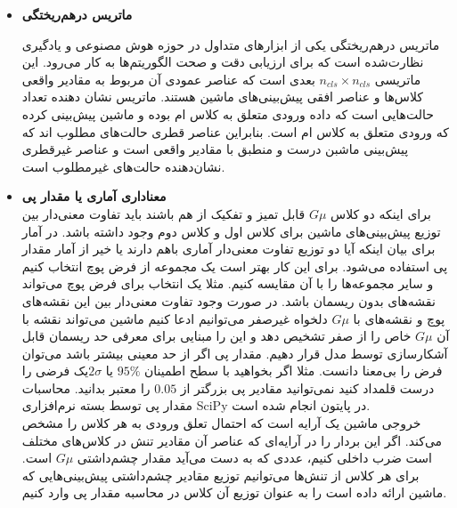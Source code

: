\begin{itemize}
	\item \textbf{ماتریس درهم‌ریختگی}
	
	ماتریس درهم‌ریختگی یکی از ابزارهای متداول در حوزه هوش مصنوعی و یادگیری نظارت‌شده است که برای ارزیابی دقت و صحت الگوریتم‌ها به کار می‌رود. این ماتریسی   
	$n_{cls} \times n_{cls}$
	بعدی است که عناصر عمودی آن مربوط به مقادیر واقعی کلاس‌ها و عناصر افقی پیش‌بینی‌های ماشین هستند. 
	 ماتریس نشان دهنده تعداد حالت‌هایی است که داده ورودی متعلق به کلاس  ام بوده و ماشین پیش‌بینی کرده که ورودی متعلق به کلاس  ام است. بنابراین عناصر قطری حالت‌های مطلوب اند که پیش‌بینی ماشبن درست و منطبق با مقادیر واقعی است و عناصر غیرقطری نشان‌دهنده حالت‌های غیرمطلوب است.
	\item \textbf{معناداری آماری یا مقدار پی} \\
	برای اینکه دو کلاس $G\mu$ قابل تمیز و تفکیک از هم باشند باید تفاوت معنی‌دار بین توزیع پیش‌بینی‌های ماشین برای کلاس اول و کلاس دوم وجود داشته باشد. در آمار برای بیان اینکه آیا دو توزیع تفاوت معنی‌دار آماری باهم دارند یا خیر از آمار مقدار پی	استفاده می‌شود. برای این کار بهتر است یک مجموعه از فرض پوچ 
	انتخاب کنیم و سایر مجموعه‌ها را با آن مقایسه کنیم.
		\cite{bruce2020practical}
		مثلا یک انتخاب برای فرض پوچ می‌تواند نقشه‌های بدون ریسمان باشد. در صورت وجود تفاوت معنی‌دار بین این نقشه‌های پوچ و نقشه‌های با $G\mu$ دلخواه غیرصفر می‌توانیم ادعا کنیم ماشین می‌تواند نقشه با آن $G\mu$ خاص را از صفر تشخیص دهد و این را مبنایی برای معرفی حد ریسمان قابل آشکارسازی توسط مدل قرار دهیم. مقدار پی اگر از حد معینی بیشتر باشد می‌توان فرض را بی‌معنا دانست. مثلا اگر بخواهید با سطح اطمینان $95\%$ یا $2\sigma$یک فرضی را درست قلمداد کنید نمی‌توانید مقادیر پی بزرگتر از $0.05$ را معتبر بدانید. 
	محاسبات مقدار پی توسط بسته نرم‌افزاری SciPy 
	\cite{virtanen2020scipy}
	در پایتون انجام شده است.\\
	خروجی‌ ماشین یک آرایه است که احتمال تعلق ورودی به هر کلاس را مشخص می‌کند. اگر این بردار را در آرایه‌ای که عناصر آن مقادیر تنش در کلاس‌های مختلف است ضرب داخلی کنیم، عددی که به دست می‌آید مقدار چشم‌داشتی $G\mu$ است. برای هر کلاس از تنش‌ها می‌توانیم توزیع مقادیر چشم‌داشتی پیش‌بینی‌هایی که ماشین ارائه داده است را به عنوان توزیع آن کلاس در محاسبه مقدار پی وارد کنیم.

\end{itemize}    

